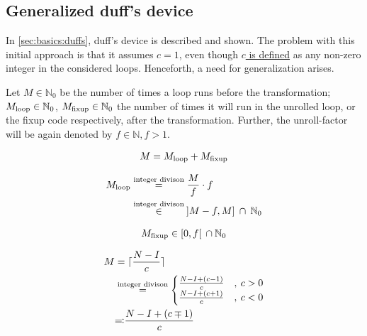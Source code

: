 \subsection{Generalized duff's device}\label{sec:impl:fixup:duff}

In \cref{sec:basics:duffs}, duff's device is described and shown.
The problem with this initial approach is that it assumes $c = 1$, even though \hyperref[sec:impl::def-c]{$c$ is defined} as any non-zero integer in the considered loops.
Henceforth, a need for generalization arises.

Let $M \in \mathbb{N}_0$ be the number of times a loop runs before the transformation; $M_{\text{loop}} \in \mathbb{N}_0$, $M_{\text{fixup}} \in \mathbb{N}_0$ the number of times it will run in the unrolled loop, or the fixup code respectively, after the transformation.
Further, the unroll-factor will be again denoted by $f \in \mathbb{N}, f > 1$.

\begin{equation}\label{eqn:impl:fixup:duff:conserve-semantics-identity}
    \begin{aligned}
        M = M_{\text{loop}} + M_{\text{fixup}}
    \end{aligned}
\end{equation}

\begin{equation}\label{eqn:impl:fixup:duff:loop-iterations}
    \begin{aligned}
        M_{\text{loop}} &\overset{\text{integer divison}}{=} \frac{M}{f} \cdot f\\
        &\overset{\text{integer divison}}{\in} \medspace \rbrack M-f,M \rbrack \medspace \cap \medspace \mathbb{N}_0
    \end{aligned}
\end{equation}

\begin{equation}\label{eqn:impl:fixup:duff:fixup-interval}
    \begin{aligned}
        M_{\text{fixup}} \in \lbrack0, f\lbrack \medspace \medspace \cap \medspace \mathbb{N}_0
    \end{aligned}
\end{equation}

\begin{equation}\label{eqn:impl:fixup:duff:total-iteration-based-on-bounds}
    \begin{aligned}
        M &= \ceil{\frac{N - I}{c}} \\
        & \overset{\text{integer divison}}{=}
        \begin{cases}
              \frac{N - I + (c - 1)}{c} &, \medspace c > 0\\
              \frac{N - I + (c + 1)}{c} &, \medspace c < 0
        \end{cases}\\
        &\text{\reflectbox{$\coloneqq$}} \frac{N - I + (c \mp 1)}{c}
    \end{aligned}
\end{equation}

